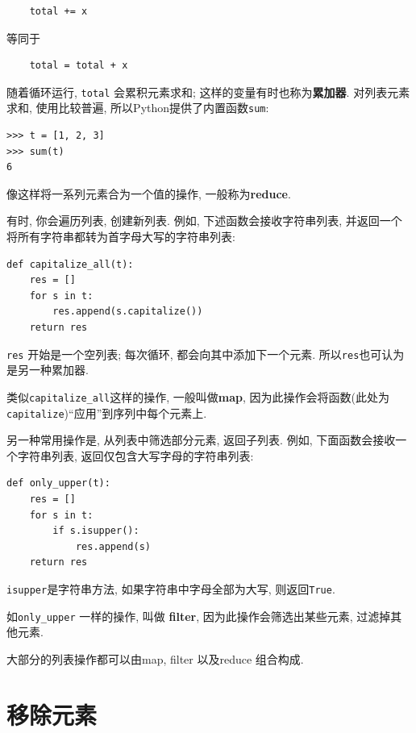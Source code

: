 \documentclass[10pt]{book}
\begin{document}
\begin{verbatim}
    total += x
\end{verbatim}
%
等同于

\begin{verbatim}
    total = total + x
\end{verbatim}
%
随着循环运行, {\tt total} 会累积元素求和;
这样的变量有时也称为{\bf 累加器}. 
对列表元素求和, 使用比较普遍, 所以Python提供了内置函数{\tt sum}:

\begin{verbatim}
>>> t = [1, 2, 3]
>>> sum(t)
6
\end{verbatim}
%
像这样将一系列元素合为一个值的操作, 一般称为{\bf reduce}.

有时, 你会遍历列表, 创建新列表. 例如, 下述函数会接收字符串列表, 
并返回一个将所有字符串都转为首字母大写的字符串列表:

\begin{verbatim}
def capitalize_all(t):
    res = []
    for s in t:
        res.append(s.capitalize())
    return res
\end{verbatim}
%
{\tt res} 开始是一个空列表; 每次循环, 都会向其中添加下一个元素. 
所以{\tt res}也可认为是另一种累加器. 

类似\verb"capitalize_all"这样的操作, 一般叫做{\bf map}, 
因为此操作会将函数(此处为{\tt capitalize})``应用''到序列中每个元素上. 

另一种常用操作是, 从列表中筛选部分元素, 返回子列表. 例如, 
下面函数会接收一个字符串列表, 返回仅包含大写字母的字符串列表:

\begin{verbatim}
def only_upper(t):
    res = []
    for s in t:
        if s.isupper():
            res.append(s)
    return res
\end{verbatim}
%
{\tt isupper}是字符串方法, 如果字符串中字母全部为大写, 则返回{\tt True}. 

如\verb"only_upper" 一样的操作, 叫做 {\bf filter}, 因为此操作会筛选出某些元素, 
过滤掉其他元素. 

大部分的列表操作都可以由map, filter 以及reduce 组合构成. 


\section{移除元素}
\end{document}
